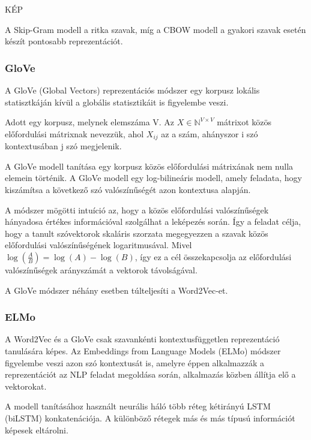 KÉP

\begin{note}
	A Skip-Gram modell a ritka szavak, míg a CBOW modell a gyakori szavak esetén készít pontosabb reprezentációt.
\end{note}


\subsubsection{GloVe}
A GloVe (Global Vectors) reprezentációs módszer egy korpusz lokális statisztkáján kívül a globális statisztikáit is figyelembe veszi. 

\begin{definition}
	Adott egy korpusz, melynek elemszáma V. Az $X \in \mathbb{N}^{V \times V}$ mátrixot közös előfordulási mátrixnak nevezzük, ahol $X_{ij}$ az a  szám, ahányszor i szó kontextusában j szó megjelenik.  
\end{definition}

A GloVe modell tanítása egy korpusz közös előfordulási mátrixának nem nulla elemein történik. A GloVe modell egy log-bilineáris modell, amely feladata, hogy kiszámítsa a következő szó valószínűségét azon kontextusa alapján.

A módszer mögötti intuíció az, hogy a közös előfordulási valószínűségek hányadosa értékes információval szolgálhat a leképezés során. Így a feladat célja, hogy a tanult szóvektorok skaláris szorzata megegyezzen a szavak közös előfordulási valószínűségének logaritmusával. Mivel $\log \left( \frac{A}{B} \right) = \log \left( A \right) - \log \left( B \right)$, így ez a cél összekapcsolja az előfordulási valószínűségek arányszámát a vektorok távolságával.

\begin{note}
	A GloVe módszer néhány esetben túlteljesíti a Word2Vec-et.
\end{note}

\subsubsection{ELMo}
A Word2Vec és a GloVe csak szavankénti kontextusfüggetlen reprezentáció tanulására képes. Az Embeddings from Language Models (ELMo) módszer figyelembe veszi azon szó kontextusát is, amelyre éppen alkalmazzák a reprezentációt az NLP feladat megoldása során, alkalmazás közben állítja elő a vektorokat.

A modell tanításához használt neurális háló több réteg kétirányú LSTM (biLSTM) konkatenációja. A különböző rétegek más és más típusú információt képesek eltárolni.

